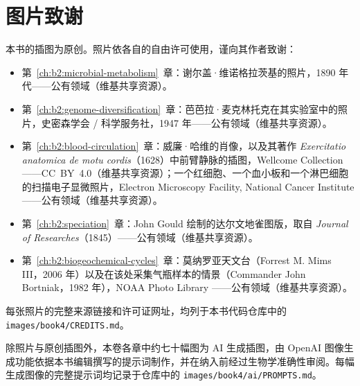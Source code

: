 \chapter*{图片致谢}

本书的插图为原创。照片依各自的自由许可使用，谨向其作者致谢：

\begin{itemize}
  \item 第~\ref{ch:b2:microbial-metabolism}~章：谢尔盖·维诺格拉茨基的照片，1890 年代——公有领域（维基共享资源）。
  \item 第~\ref{ch:b2:genome-diversification}~章：芭芭拉·麦克林托克在其实验室中的照片，史密森学会 / 科学服务社，1947 年——公有领域（维基共享资源）。
  \item 第~\ref{ch:b2:blood-circulation}~章：威廉·哈维的肖像，以及其著作 \emph{Exercitatio anatomica de motu cordis}（1628）中前臂静脉的插图，Wellcome
        Collection——CC~BY~4.0（维基共享资源）；一个红细胞、一个血小板和一个淋巴细胞的扫描电子显微照片，Electron
        Microscopy Facility, National Cancer Institute——公有领域（维基共享资源）。
  \item 第~\ref{ch:b2:speciation}~章：John Gould 绘制的达尔文地雀图版，取自 \emph{Journal of Researches}（1845）——公有领域（维基共享资源）。
  \item 第~\ref{ch:b2:biogeochemical-cycles}~章：莫纳罗亚天文台（Forrest M. Mims III，2006 年）以及在该处采集气瓶样本的情景（Commander John Bortniak，1982 年），NOAA Photo Library
——公有领域（维基共享资源）。
\end{itemize}

每张照片的完整来源链接和许可证网址，均列于本书代码仓库中的 \texttt{images/book4/CREDITS.md}。

\bigskip
除照片与原创插图外，本卷各章中约七十幅图为 AI 生成插图，由 OpenAI 图像生成功能依据本书编辑撰写的提示词制作，并在纳入前经过生物学准确性审阅。每幅生成图像的完整提示词均记录于仓库中的 \texttt{images/book4/ai/PROMPTS.md}。
\clearpage
